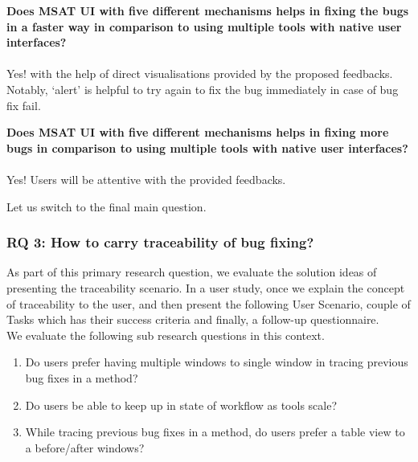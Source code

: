 \begin{myboxi}{{\textbf{Does MSAT UI with five different mechanisms helps in fixing the bugs in a faster way in comparison to using multiple tools with native user interfaces?}}}
	\\ \\ Yes! with the help of direct visualisations provided by the proposed feedbacks. Notably, ‘alert’ is helpful to try again to fix the bug immediately in case of bug fix fail. \\
\end{myboxi}

\begin{myboxi}{{\textbf{Does MSAT UI with five different mechanisms helps in fixing more bugs in comparison to using multiple tools with native user interfaces?}}}
	\\ \\ Yes! Users will be attentive with the provided feedbacks. \\
\end{myboxi}


Let us switch to the final main question. \\

\subsubsection{RQ 3: How to carry traceability of bug fixing?}

As part of this primary research question, we evaluate the solution ideas of presenting the traceability scenario. In a user study, once we explain the concept of traceability to the user, and then present the following User Scenario, couple of Tasks which has their success criteria and finally, a follow-up questionnaire. \\

We evaluate the following sub research questions in this context. \\

\begin{enumerate}
\item Do users prefer having multiple windows to single window in tracing previous bug fixes in a method?
\item Do users be able to keep up in state of workflow as tools scale?
\item While tracing previous bug fixes in a method, do users prefer a table view to a before/after windows?
\end{enumerate}


